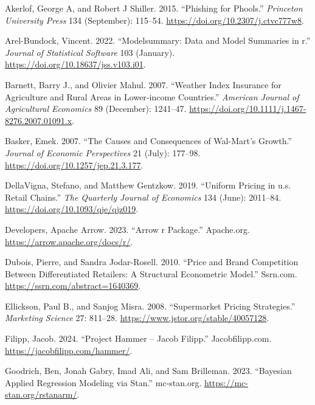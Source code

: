 \documentclass[
  letterpaper,
  DIV=11,
  numbers=noendperiod]{scrartcl}
\newlength{\cslhangindent}
\newenvironment{CSLReferences}[2] %
 {\begin{list}{}{%
  \setlength{\itemindent}{0pt}
  \setlength{\leftmargin}{0pt}
  \setlength{\parsep}{0pt}
  \ifodd #1
   \setlength{\leftmargin}{\cslhangindent}
   \setlength{\itemindent}{-1\cslhangindent}
  \fi
  \setlength{\itemsep}{#2\baselineskip}}}
 {\end{list}}
\begin{document}
\label{refs}
\begin{CSLReferences}{1}{0}
Akerlof, George A, and Robert J Shiller. 2015. {``Phishing for
Phools.''} \emph{Princeton University Press} 134 (September): 115--54.
\url{https://doi.org/10.2307/j.ctvc777w8}.

Arel-Bundock, Vincent. 2022. {``Modelsummary: Data and Model Summaries
in r.''} \emph{Journal of Statistical Software} 103 (January).
\url{https://doi.org/10.18637/jss.v103.i01}.

Barnett, Barry J., and Olivier Mahul. 2007. {``Weather Index Insurance
for Agriculture and Rural Areas in Lower‐income Countries.''}
\emph{American Journal of Agricultural Economics} 89 (December):
1241--47. \url{https://doi.org/10.1111/j.1467-8276.2007.01091.x}.

Basker, Emek. 2007. {``The Causes and Consequences of Wal-Mart's
Growth.''} \emph{Journal of Economic Perspectives} 21 (July): 177--98.
\url{https://doi.org/10.1257/jep.21.3.177}.

DellaVigna, Stefano, and Matthew Gentzkow. 2019. {``Uniform Pricing in
u.s. Retail Chains.''} \emph{The Quarterly Journal of Economics} 134
(June): 2011--84. \url{https://doi.org/10.1093/qje/qjz019}.

Developers, Apache Arrow. 2023. {``Arrow r Package.''} Apache.org.
\url{https://arrow.apache.org/docs/r/}.

Dubois, Pierre, and Sandra Jodar-Rosell. 2010. {``Price and Brand
Competition Between Differentiated Retailers: A Structural Econometric
Model.''} Ssrn.com. \url{https://ssrn.com/abstract=1640369}.

Ellickson, Paul B., and Sanjog Misra. 2008. {``Supermarket Pricing
Strategies.''} \emph{Marketing Science} 27: 811--28.
\url{https://www.jstor.org/stable/40057128}.

Filipp, Jacob. 2024. {``Project Hammer -- Jacob Filipp.''}
Jacobfilipp.com. \url{https://jacobfilipp.com/hammer/}.

Goodrich, Ben, Jonah Gabry, Imad Ali, and Sam Brilleman. 2023.
{``Bayesian Applied Regression Modeling via Stan.''} mc-stan.org.
\url{https://mc-stan.org/rstanarm/}.


\end{CSLReferences}
\end{document}
